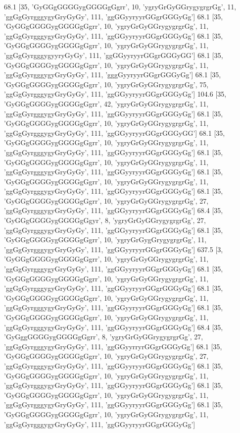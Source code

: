 68.1 [35, 'GyGGgGGGGygGGGGgGgrr', 10, 'ygryGrGyGGrygygrgrGg', 11, 'ggGgGyrgggygyGryGyGy', 111, 'ggGGyyryyrGGgrGGGyGg']
68.1 [35, 'GyGGgGGGGygGGGGgGgrr', 10, 'ygryGrGyGGrygygrgrGg', 11, 'ggGgGyrgggygyGryGyGy', 111, 'ggGGyyryyrGGgrGGGyGg']
68.1 [35, 'GyGGgGGGGygGGGGgGgrr', 10, 'ygryGrGyGGrygygrgrGg', 11, 'ggGgGyrgggygyyryGyGy', 111, 'ggGGyyryyrGGgrGGGyGG']
68.1 [35, 'GyGGgGGGGygGGGGgGgrr', 10, 'ygryGrGyGGrygygrgrGg', 11, 'ggGgGyrgggygyGryGyGy', 111, 'gggGyyryyrGGgrGGGyGg']
68.1 [35, 'GyGGgGGGGygGGGGgGgrr', 10, 'ygryGrGyGGrygygrgrGg', 75, 'ggGgGyrgggygyGryGyGy', 111, 'ggGGyyryyrGGgrGGGyGg']
104.6 [35, 'GyGGgGGGGygGGGGgGgrr', 42, 'ygryGrGyGGrygygrgrGg', 11, 'ggGgGyrgggygyGryGyGy', 111, 'ggGGyyryyrGGgrGGGyGg']
68.1 [35, 'GyGGgGGGGygGGGGgGgrr', 10, 'ygryGrGyGGrygygrgrGg', 11, 'ggGgGyrgggygyGryGyGy', 111, 'ggGGyyryyrGGgrGGGyGG']
68.1 [35, 'GyGGgGGGGygGGGGgGgrr', 10, 'ygryGrGyGGrygygrgrGg', 11, 'ggGgGyrgggygyGryGyGy', 111, 'ggGGyyryyrGGgrGGGyGg']
68.1 [35, 'GyGGgGGGGygGGGGgGgrr', 10, 'ygryGrGyGGrygygrgrGg', 11, 'ggGgGyrgggygyGryGyGy', 111, 'ggGGyyryyrGGgrGGGyGg']
68.1 [35, 'GyGGgGGGGygGGGGgGgrr', 10, 'ygryGrGyGGrygygrgrGg', 11, 'ggGgGyrgggygyGryGyGy', 111, 'ggGGyyryyrGGgrGGGyGg']
68.1 [35, 'GyGGgGGGGygGGGGgGgrr', 10, 'ygryGrGyGGrygygrgrGg', 27, 'ggGgGyrgggygyGryGyGy', 111, 'ggGGyyryyrGGgrGGGyGg']
68.4 [35, 'GyGGgGGGGygGGGGgGgyr', 8, 'ygryGrGyGGrygygrgrGg', 27, 'ggGgGyrgggygyGryGyGy', 111, 'ggGGyyryyrGGgrGGGyGg']
68.1 [35, 'GyGGgGGGGygGGGGgGgrr', 10, 'ygryGrGygGrygygrgrGg', 11, 'ggGgGyrgggygyGryGyGy', 111, 'ggGGyyryyrGGgrGGGyGg']
637.5 [3, 'GyGGgGGGGygGGGGgGgrr', 10, 'ygryGrGyGGrygygrgrGg', 11, 'ggGgGyrgggygyGryGyGy', 111, 'ggGGyyryyrGGgrGGGyGg']
68.1 [35, 'GyGGgGGGGygGGGGgGgrr', 10, 'ygryGrGyGGrygygrgrGg', 11, 'ggGgGyrgggygyGryGyGy', 111, 'ggGGyyryyrGGgrGGGyGg']
68.1 [35, 'GyGGgGGGGygGGGGgGgrr', 10, 'ygryGrGyGGrygygrgrGg', 11, 'ggGgGyrgggygyGryGyGy', 111, 'ggGGyyryyrGGgrGGGyGg']
68.1 [35, 'GyGGgGGGGygGGGGgGgrr', 10, 'ygryGrGyGGrygygrgrGg', 11, 'ggGgGyrgggygyGryGyGy', 111, 'ggGGyyryyrGGgrGGGyGg']
68.4 [35, 'GyGggGGGGygGGGGgGgrr', 8, 'ygryGrGyGGrygygrgrGg', 27, 'ggGgGyrgggygyGryGyGy', 111, 'ggGGyyrryrGGgrGGGyGg']
68.1 [35, 'GyGGgGGGGygGGGGgGgrr', 10, 'ygryGrGyGGrygygrgrGg', 27, 'ggGgGyrgggygyGryGyGy', 111, 'ggGGyyryyrGGgrGGGyGg']
68.1 [35, 'GyGGgGGGGygGGGGgGgrr', 10, 'ygryGrGyGGrygygrgrGg', 11, 'ggGgGyrgggygyGryGyGy', 111, 'ggGGyyryyrGGgrGGGyGg']
68.1 [35, 'GyGGgGGGGygGGGGgGgrr', 10, 'ygryGrGyGGrygygrgrGg', 11, 'ggGgGyrgggygyGryGyGy', 111, 'ggGGyyryyrGGgrGGGyGg']
68.1 [35, 'GyGGgGGGGygGGGGgGgrr', 10, 'ygryGrGyGGrygygrgrGg', 11, 'ggGgGyrgggygyGryGyGy', 111, 'ggGGyyryyrGGgrGGGyGg']
